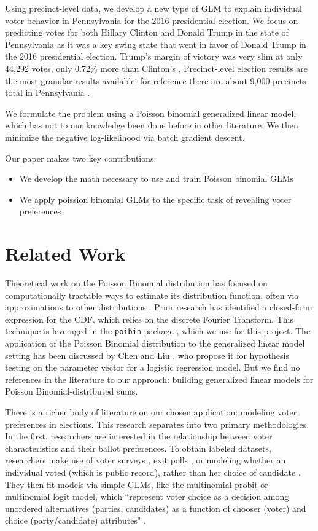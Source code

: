 \documentclass[10pt, letterpaper]{article}
\begin{document}
Using precinct-level data, we develop a new type of GLM to explain individual voter behavior in Pennsylvania for the 2016 presidential election. We focus on predicting votes for both Hillary Clinton and Donald Trump in the state of Pennsylvania as it was a key swing state that went in favor of Donald Trump in the 2016 presidential election. Trump's margin of victory was very slim at only 44,292 votes, only 0.72\% more than Clinton's \cite{NYT}. Precinct-level election results are the most granular results available; for reference there are about 9,000 precincts total in Pennsylvania \cite{NYT}. 

We formulate the problem using a Poisson binomial generalized linear model, which has not to our knowledge been done before in other literature. We then minimize the negative log-likelihood via batch gradient descent.

Our paper makes two key contributions:
\begin{itemize}[noitemsep]
	\item We develop the math necessary to use and train Poisson binomial GLMs
	\item We apply poission binomial GLMs to the specific task of revealing voter preferences
\end{itemize}

\section{Related Work}
Theoretical work on the Poisson Binomial distribution has focused on computationally tractable ways to estimate its distribution function, often via approximations to other distributions 
\cite{EHM19917, roos1999, chen1974}. Prior research \cite{HONG201341} has identified a closed-form expression for the CDF, which relies on the discrete Fourier Transform. This technique is leveraged in the \texttt{poibin} package \cite{PoibiGithub}, which we use for this project. The application of the Poisson Binomial distribution to the generalized linear model setting has been discussed by Chen and Liu \cite{Poibi}, who propose it for hypothesis testing on the parameter vector for a logistic regression model. But we find no references in the literature to our approach: building generalized linear models for Poisson Binomial-distributed sums. 

There is a richer body of literature on our chosen application: modeling voter preferences in elections. This research separates into two primary methodologies. In the first, researchers are interested in the relationship between voter characteristics and their ballot preferences. To obtain labeled datasets, researchers make use of voter surveys \cite{dubrow2007choosing}, exit polls \cite{carsey1995contextual}, or modeling whether an individual voted (which is public record), rather than her choice of candidate \cite{rusch2013influencing}. They then fit models via simple GLMs, like the multinomial probit or multinomial logit model, which ``represent voter choice as a decision among unordered alternatives (parties, candidates) as a function of chooser (voter) and choice (party/candidate) attributes" \cite{DOW2004107}. 
\end{document}
